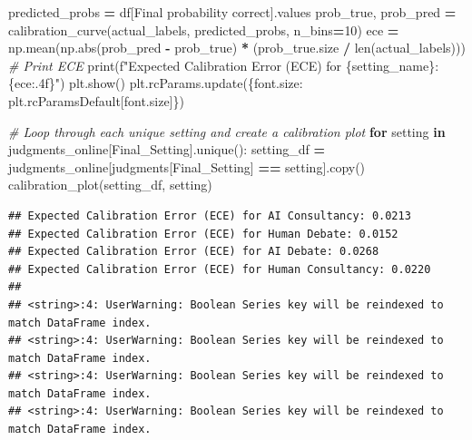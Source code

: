 \documentclass[
]{article}
\newenvironment{Shaded}{\begin{snugshade}}{\end{snugshade}}
\newcommand{\BuiltInTok}[1]{#1}
\newcommand{\CommentTok}[1]{\textcolor[rgb]{0.56,0.35,0.01}{\textit{#1}}}
\newcommand{\ControlFlowTok}[1]{\textcolor[rgb]{0.13,0.29,0.53}{\textbf{#1}}}
\newcommand{\DecValTok}[1]{\textcolor[rgb]{0.00,0.00,0.81}{#1}}
\newcommand{\KeywordTok}[1]{\textcolor[rgb]{0.13,0.29,0.53}{\textbf{#1}}}
\newcommand{\NormalTok}[1]{#1}
\newcommand{\OperatorTok}[1]{\textcolor[rgb]{0.81,0.36,0.00}{\textbf{#1}}}
\newcommand{\SpecialCharTok}[1]{\textcolor[rgb]{0.00,0.00,0.00}{#1}}
\newcommand{\SpecialStringTok}[1]{\textcolor[rgb]{0.31,0.60,0.02}{#1}}
\newcommand{\StringTok}[1]{\textcolor[rgb]{0.31,0.60,0.02}{#1}}
\begin{document}
\begin{Shaded}
\begin{Highlighting}[]
\NormalTok{    predicted\_probs }\OperatorTok{=}\NormalTok{ df[}\StringTok{\textquotesingle{}Final probability correct\textquotesingle{}}\NormalTok{].values}
\NormalTok{    prob\_true, prob\_pred }\OperatorTok{=}\NormalTok{ calibration\_curve(actual\_labels, predicted\_probs, n\_bins}\OperatorTok{=}\DecValTok{10}\NormalTok{)}
\NormalTok{    ece }\OperatorTok{=}\NormalTok{ np.mean(np.}\BuiltInTok{abs}\NormalTok{(prob\_pred }\OperatorTok{{-}}\NormalTok{ prob\_true) }\OperatorTok{*}\NormalTok{ (prob\_true.size }\OperatorTok{/} \BuiltInTok{len}\NormalTok{(actual\_labels)))}
    \CommentTok{\# Print ECE}
    \BuiltInTok{print}\NormalTok{(}\SpecialStringTok{f"Expected Calibration Error (ECE) for }\SpecialCharTok{\{}\NormalTok{setting\_name}\SpecialCharTok{\}}\SpecialStringTok{: }\SpecialCharTok{\{}\NormalTok{ece}\SpecialCharTok{:.4f\}}\SpecialStringTok{"}\NormalTok{)}
\NormalTok{    plt.show()}
\NormalTok{    plt.rcParams.update(\{}\StringTok{\textquotesingle{}font.size\textquotesingle{}}\NormalTok{: plt.rcParamsDefault[}\StringTok{\textquotesingle{}font.size\textquotesingle{}}\NormalTok{]\})}

\CommentTok{\# Loop through each unique setting and create a calibration plot}
\ControlFlowTok{for}\NormalTok{ setting }\KeywordTok{in}\NormalTok{ judgments\_online[}\StringTok{\textquotesingle{}Final\_Setting\textquotesingle{}}\NormalTok{].unique():}
\NormalTok{    setting\_df }\OperatorTok{=}\NormalTok{ judgments\_online[judgments[}\StringTok{\textquotesingle{}Final\_Setting\textquotesingle{}}\NormalTok{] }\OperatorTok{==}\NormalTok{ setting].copy()}
\NormalTok{    calibration\_plot(setting\_df, setting)}
\end{Highlighting}
\end{Shaded}

\begin{verbatim}
## Expected Calibration Error (ECE) for AI Consultancy: 0.0213
## Expected Calibration Error (ECE) for Human Debate: 0.0152
## Expected Calibration Error (ECE) for AI Debate: 0.0268
## Expected Calibration Error (ECE) for Human Consultancy: 0.0220
## 
## <string>:4: UserWarning: Boolean Series key will be reindexed to match DataFrame index.
## <string>:4: UserWarning: Boolean Series key will be reindexed to match DataFrame index.
## <string>:4: UserWarning: Boolean Series key will be reindexed to match DataFrame index.
## <string>:4: UserWarning: Boolean Series key will be reindexed to match DataFrame index.
\end{verbatim}
\end{document}
